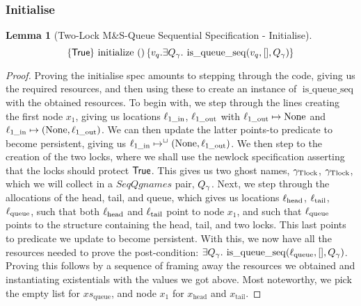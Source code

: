 \documentclass[a4paper, 10pt]{report}
\theoremstyle{definition}
\newtheorem{lemma}[theorem]{Lemma}
\newcommand{\initialise}{\operatorname{initialize}}
\newcommand{\msq}{M\&S-Queue\xspace}
\newcommand{\tlmsq}{Two-Lock \msq}
\newcommand{\isqueueseq}{\operatorname{is\_queue\_seq}}
\newcommand{\SeqQgnames}{SeqQgnames}
\newcommand{\vq}{v_q}
\newcommand{\xsqueue}{xs_{\mathrm{queue}}}
\newcommand{\locinM}[1]{\loc_{#1\_\mathrm{in}}}
\newcommand{\locoutM}[1]{\loc_{#1\_\mathrm{out}}}
\newcommand{\locN}[1]{\loc_{\mathrm{#1}}}
\newcommand{\lochead}{\locN{head}}
\newcommand{\loctail}{\locN{tail}}
\newcommand{\locqueue}{\locN{queue}}
\newcommand{\node}{x}
\newcommand{\nodeM}[1]{\node_{#1}}
\newcommand{\nodeN}[1]{\node_{\mathrm{#1}}}
\newcommand{\nodehead}{\nodeN{head}}
\newcommand{\nodetail}{\nodeN{tail}}
\newcommand{\Qg}{Q_\gname}
\newcommand{\gtlock}{\gname_{\mathrm{Tlock}}}
\newcommand{\tlseqspecinit}{\hoare{\TRUE}{\initialise \ \TT}{\vq . \Exists \Qg. \isqueueseq(\vq, [], \Qg)}}
\begin{document}
\subsubsection{Initialise}
\begin{lemma}[\tlmsq Sequential Specification - Initialise]\label{TLMSQ:spec:seq:init}
  \begin{equation*}
    \tlseqspecinit
  \end{equation*}
\end{lemma}
\begin{proof}
Proving the initialise spec amounts to stepping through the code, giving us the required resources, and then using these to create an instance of $\isqueueseq$ with the obtained resources. To begin with, we step through the lines creating the first node $\nodeM{1}$, giving us locations $\locinM{1}$, $\locoutM{1}$ with $\locoutM{1} \mapsto \None$ and $\locinM{1} \mapsto (\None, \locoutM{1})$. We can then update the latter points-to predicate to become persistent, giving us $\locinM{1} \mapsto^{\persistently} (\None, \locoutM{1})$. We then step to the creation of the two locks, where we shall use the newlock specification asserting that the locks should protect $\textsf{True}$. This gives us two ghost names, $\gtlock$, $\gtlock$, which we will collect in a $\SeqQgnames$ pair, $\Qg$.
Next, we step through the allocations of the head, tail, and queue, which gives us locations $\lochead$, $\loctail$, $\locqueue$, such that both $\lochead$ and $\loctail$ point to node $\nodeM{1}$, and such that $\locqueue$ points to the structure containing the head, tail, and two locks. This last points to predicate we update to become persistent.
With this, we now have all the resources needed to prove the post-condition: $\Exists \Qg . \isqueueseq(\locqueue, [], \Qg)$. Proving this follows by a sequence of framing away the resources we obtained and instantiating existentials with the values we got above. Most noteworthy, we pick the empty list for $\xsqueue$, and node $\nodeM{1}$ for $\nodehead$ and $\nodetail$.
\end{proof}
\end{document}
